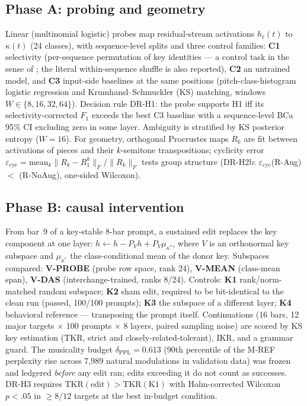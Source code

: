 \documentclass[conference]{IEEEtran}
\newcommand{\tkr}{\mathrm{TKR}}
\newcommand{\ikr}{\mathrm{IKR}}
\begin{document}
\subsection{Phase A: probing and geometry}
Linear (multinomial logistic) probes map residual-stream activations
$h_\ell(t)$ to $\kappa(t)$ (24 classes), with sequence-level splits and three
control families: \textbf{C1} selectivity (per-sequence permutation of key
identities --- a control task in the sense of \cite{hewitt2019control}; the
literal within-sequence shuffle is also reported), \textbf{C2} an untrained
model, and \textbf{C3} input-side baselines at the same positions
(pitch-class-histogram logistic regression and Krumhansl--Schmuckler (KS)
matching, windows $W\in\{8,16,32,64\}$). Decision rule DR-H1: the probe
supports H1 iff its selectivity-corrected $F_1$ exceeds the best C3 baseline
with a sequence-level BCa 95\% CI excluding zero in some layer. Ambiguity is
stratified by KS posterior entropy ($W{=}16$). For geometry, orthogonal
Procrustes maps $R_k$ are fit between activations of pieces and their
$k$-semitone transpositions; cyclicity error
$\varepsilon_{\mathrm{cyc}}=\mathrm{mean}_k\|R_k-R_1^k\|_F/\|R_k\|_F$
tests group structure (DR-H2b: $\varepsilon_{\mathrm{cyc}}$(R-Aug) $<$
(R-NoAug), one-sided Wilcoxon).

\subsection{Phase B: causal intervention}
From bar~9 of a key-stable 8-bar prompt, a sustained edit replaces the key
component at one layer: $h \leftarrow h - P_V h + P_V\mu_{\kappa^*}$, where
$V$ is an orthonormal key subspace and $\mu_{\kappa^*}$ the class-conditional
mean of the donor key. Subspaces compared: \textbf{V-PROBE} (probe row
space, rank 24), \textbf{V-MEAN} (class-mean span), \textbf{V-DAS}
(interchange-trained, ranks 8/24). Controls: \textbf{K1} rank/norm-matched
random subspace; \textbf{K2} sham edit, required to be bit-identical to the
clean run (passed, 100/100 prompts); \textbf{K3} the subspace of a different
layer; \textbf{K4} behavioral reference --- transposing the prompt itself.
Continuations (16 bars, 12 major targets $\times$ 100 prompts $\times$ 8
layers, paired sampling noise) are scored by KS key estimation ($\tkr$,
strict and closely-related-tolerant), $\ikr$, and a grammar guard. The
musicality budget $\delta_{\mathrm{PPL}}{=}0.613$ (90th percentile of the
M-REF perplexity rise across 7{,}989 natural modulations in validation data)
was frozen and ledgered \emph{before} any edit ran; edits exceeding it do not
count as successes. DR-H3 requires $\tkr(\text{edit})>\tkr(\text{K1})$ with
Holm-corrected Wilcoxon $p<.05$ in $\geq 8/12$ targets at the best in-budget
condition.
\end{document}
